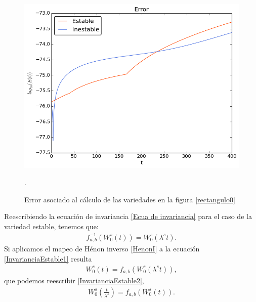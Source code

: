 \begin{figure}[H]
\centering
\includegraphics[scale=0.6]{error-rectangulo}
\caption{Error asociado al cálculo de las variedades en la figura \ref{rectangulo0}}.
\label{ErrorRectangulo0}
\end{figure} 

Reescribiendo la ecuación de invariancia \eqref{Ecua de invariancia} para el caso de la variedad estable, tenemos que:
\begin{eqnarray}
f_{a,b}^{-1}(W_{0}^{s}(t))=W_{0}^{s}(\lambda^{s}t).
\label{InvarianciaEstable1}
\end{eqnarray}
Si aplicamos el mapeo de Hénon inverso \eqref{HenonI} a la ecuación \eqref{InvarianciaEstable1} resulta
\begin{eqnarray}
W_{0}^{s}(t)=f_{a,b}(W_{0}^{s}(\lambda^{s}t)),
\label{InvarianciaEstable2}
\end{eqnarray}
que podemos reescribir \eqref{InvarianciaEstable2}, 
\begin{eqnarray}
W_{0}^{s}(\frac{t}{\lambda^{s}})=f_{a,b}(W_{0}^{s}(t)).
\label{InvarianciaEstable3}
\end{eqnarray}

